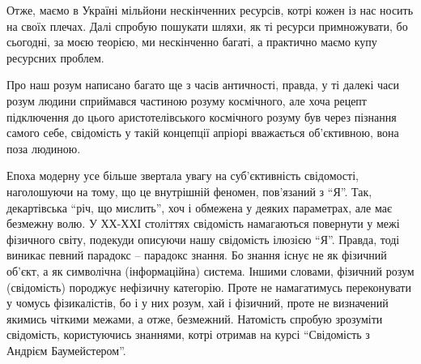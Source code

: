  
Отже, маємо в Україні мільйони нескінченних ресурсів, котрі кожен із нас носить
на своїх плечах. Далі спробую пошукати шляхи, як ті ресурси примножувати, бо
сьогодні, за моєю теорією, ми нескінченно багаті, а практично маємо купу
ресурсних проблем.

Про наш розум написано багато ще з часів античності, правда, у ті далекі часи розум людини сприймався частиною розуму космічного, але хоча рецепт підключення до цього аристотелівського космічного розуму був через пізнання самого себе, свідомість у такій концепції апріорі вважається об’єктивною, вона поза людиною.

Епоха модерну усе більше звертала увагу на суб’єктивність свідомості,
наголошуючи на тому, що це внутрішній феномен, пов’язаний з \enquote{Я}. Так,
декартівська \enquote{річ, що мислить}, хоч і обмежена у деяких параметрах, але має
безмежну волю. У ХХ-ХХІ століттях свідомість намагаються повернути у межі
фізичного світу, подекуди описуючи нашу свідомість ілюзією \enquote{Я}. Правда, тоді
виникає певний парадокс – парадокс знання. Бо знання існує не як фізичний
об’єкт, а як символічна (інформаційна) система. Іншими словами, фізичний розум
(свідомість) породжує нефізичну категорію. Проте не намагатимусь переконувати у
чомусь фізикалістів, бо і у них розум, хай і фізичний, проте не визначений
якимись чіткими межами, а отже, безмежний. Натомість спробую зрозуміти
свідомість, користуючись знаннями, котрі отримав на курсі \enquote{Свідомість з Андрієм
Баумейстером}.

